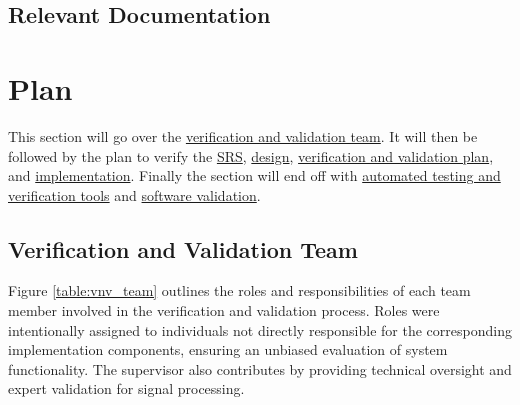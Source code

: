 \documentclass[12pt, titlepage]{article}
\begin{document}
\subsection{Relevant Documentation}




\section{Plan}

This section will go over the \hyperref[sec:vnv_team]{verification and
validation team}. It will then be followed by the plan to verify the
\hyperref[sec:srs_verification]{SRS},
\hyperref[sec:design_verification]{design}, 
\hyperref[sec:vnv_plan_verification]{verification and validation plan}, and
\hyperref[sec:implementation_verification]{implementation}. Finally the section
will end off with 
\hyperref[sec:testing_tools]{automated testing and verification tools} and
\hyperref[sec:software_validation]{software validation}.

\subsection{Verification and Validation Team}\label{sec:vnv_team}

Figure \ref{table:vnv_team} outlines the roles and responsibilities of each
team member involved in the verification and validation process. Roles were
intentionally assigned to individuals not directly responsible for the
corresponding implementation components, ensuring an unbiased evaluation of 
system functionality. The supervisor also contributes by providing technical
oversight and expert validation for signal processing.
\end{document}
